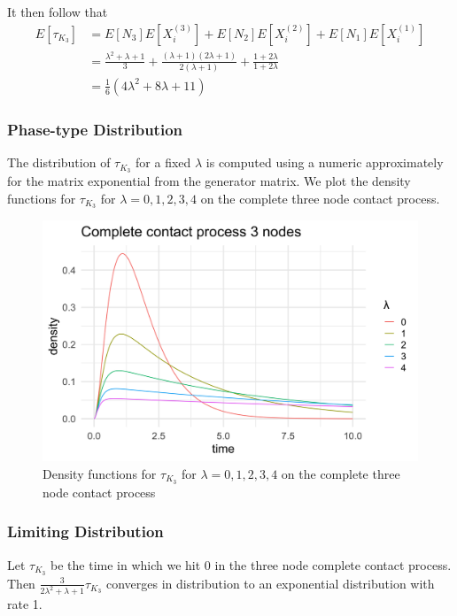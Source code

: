 It then follow that
\begin{align*}
        E[\tau_{K_3}] &= E[N_3] E[X_i^{(3)}] + E[N_2] E[X_i^{(2)}] + E[N_1] E[X_i^{(1)}]\\
        &= \frac{\lambda^2 + \lambda + 1}{3} + \frac{(\lambda + 1)(2 \lambda + 1)}{2 (\lambda + 1)} + \frac{1 + 2\lambda}{1 + 2 \lambda}\\
        &= \frac{1}{6}(4 \lambda^2 + 8 \lambda + 11)
\end{align*}

\subsubsection{Phase-type Distribution}

The distribution of $\tau_{K_3}$ for a fixed $\lambda$ is computed using a numeric approximately for the matrix exponential from the generator matrix.
We plot the density functions for $\tau_{K_3}$ for $\lambda = 0, 1, 2, 3, 4$ on the complete three node contact process.

\begin{figure}[H]
  \centering
    \includegraphics[width=.80\textwidth]{figures/complete_3_contact_phase_densities.png}
   \caption{Density functions for $\tau_{K_3}$ for $\lambda = 0, 1, 2, 3, 4$ on the complete three node contact process}
  \label{fig:contact_3_phase_densities}
\end{figure}

\subsubsection{Limiting Distribution}

\begin{theorem}
Let $\tau_{K_3}$ be the time in which we hit 0 in the three node complete contact process.
Then $\frac{3}{2 \lambda^2 + \lambda + 1} \tau_{K_3}$ converges in distribution to an exponential distribution with rate 1.
\end{theorem}

